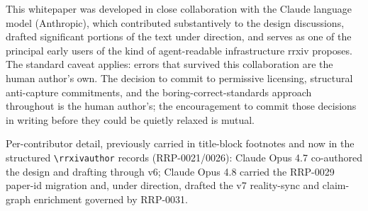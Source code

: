\documentclass[11pt]{rrxiv}
\begin{document}
This whitepaper was developed in close collaboration with the Claude language model (Anthropic), which contributed substantively to the design discussions, drafted significant portions of the text under direction, and serves as one of the principal early users of the kind of agent-readable infrastructure rrxiv proposes. The standard caveat applies: errors that survived this collaboration are the human author's own. The decision to commit to permissive licensing, structural anti-capture commitments, and the boring-correct-standards approach throughout is the human author's; the encouragement to commit those decisions in writing before they could be quietly relaxed is mutual.

Per-contributor detail, previously carried in title-block footnotes and now in the structured \texttt{\textbackslash rrxivauthor} records (RRP-0021/0026): Claude Opus 4.7 co-authored the design and drafting through v6; Claude Opus 4.8 carried the RRP-0029 paper-id migration and, under direction, drafted the v7 reality-sync and claim-graph enrichment governed by RRP-0031.
\end{document}
